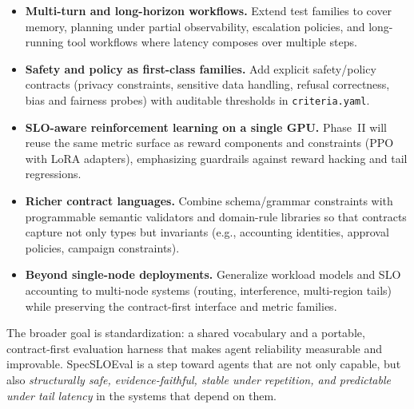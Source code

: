 \documentclass[11pt]{article}
\begin{document}
\begin{itemize}[leftmargin=12pt]
    \item \textbf{Multi-turn and long-horizon workflows.}
    Extend test families to cover memory, planning under partial observability, escalation policies, and long-running tool workflows where latency composes over multiple steps.

    \item \textbf{Safety and policy as first-class families.}
    Add explicit safety/policy contracts (privacy constraints, sensitive data handling, refusal correctness, bias and fairness probes) with auditable thresholds in \texttt{criteria.yaml}.

    \item \textbf{SLO-aware reinforcement learning on a single GPU.}
    Phase~II will reuse the same metric surface as reward components and constraints (PPO with LoRA adapters), emphasizing guardrails against reward hacking and tail regressions.

    \item \textbf{Richer contract languages.}
    Combine schema/grammar constraints with programmable semantic validators and domain-rule libraries so that contracts capture not only types but invariants (e.g., accounting identities, approval policies, campaign constraints).

    \item \textbf{Beyond single-node deployments.}
    Generalize workload models and SLO accounting to multi-node systems (routing, interference, multi-region tails) while preserving the contract-first interface and metric families.
\end{itemize}

The broader goal is standardization: a shared vocabulary and a portable, contract-first evaluation harness that makes agent reliability measurable and improvable.
SpecSLOEval is a step toward agents that are not only capable, but also \emph{structurally safe, evidence-faithful, stable under repetition, and predictable under tail latency} in the systems that depend on them.

\printbibliography
\end{document}
